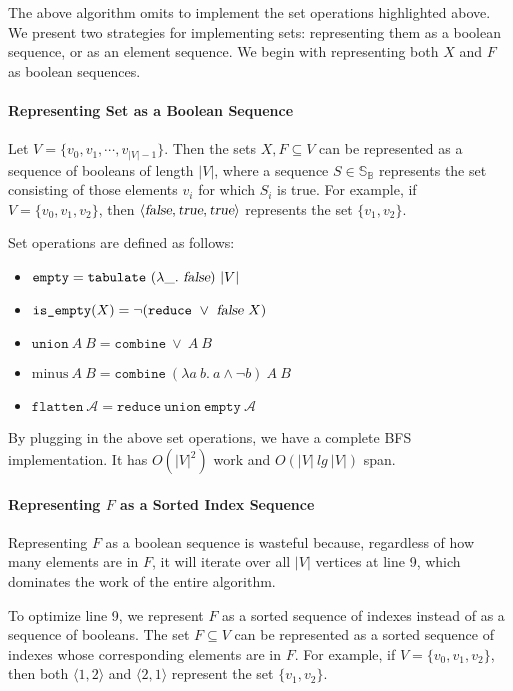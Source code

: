 \documentclass[11pt,a4paper,oneside,microtype,chapter,nokorean]{oblivoir}
\newcommand{\kwtrue}{\textsl{true}}
\newcommand{\kwfalse}{\textsl{false}}
\begin{document}
The above algorithm omits to implement the set operations highlighted above.  We present two
strategies for implementing sets: representing them as a boolean sequence, or as an element
sequence.  We begin with representing both $X$ and $F$ as boolean sequences.


\paragraph{Representing Set as a Boolean Sequence}

Let $V = \{v_0,v_1,\cdots,v_{|V|-1}\}$.  Then the sets $X, F \subseteq V$ can be represented as a
sequence of booleans of length $|V|$, where a sequence $S \in \mathbb{S}_{\mathbb{B}}$ represents
the set consisting of those elements $v_i$ for which $S_i$ is true.  For example, if
$V = \{v_0,v_1,v_2\}$, then $\langle \kwfalse, \kwtrue, \kwtrue \rangle$ represents the set
$\{v_1,v_2\}$.

Set operations are defined as follows:

\begin{itemize}
\item $\texttt{empty} = \texttt{tabulate}~(\lambda \_.~\kwfalse)~|V|$
\item $\texttt{is\_empty}(X) = \neg (\texttt{reduce}~\lor~\kwfalse~X)$
\item $\texttt{union}~A~B = \texttt{combine}~\lor~A~B$
\item $\textrm{minus}~A~B = \texttt{combine}~(\lambda a~b.~a \land \neg b)~A~B$
\item $\texttt{flatten}~\mathcal{A} = \texttt{reduce}~\texttt{union}~\texttt{empty}~\mathcal{A}$
\end{itemize}

By plugging in the above set operations, we have a complete BFS implementation.  It has $O(|V|^2)$
work and $O(|V|~lg~|V|)$ span.


\paragraph{Representing $F$ as a Sorted Index Sequence}

Representing $F$ as a boolean sequence is wasteful because, regardless of how many elements are in
$F$, it will iterate over all $|V|$ vertices at line 9, which dominates the work of the entire
algorithm.

To optimize line 9, we represent $F$ as a sorted sequence of indexes instead of as a sequence of
booleans.  The set $F \subseteq V$ can be represented as a sorted sequence of indexes whose
corresponding elements are in $F$.  For example, if $V = \{v_0,v_1,v_2\}$, then both
$\langle 1,2 \rangle$ and $\langle 2,1 \rangle$ represent the set $\{v_1,v_2\}$.
\end{document}
